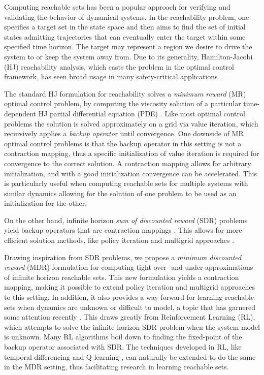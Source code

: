 
Computing reachable sets has been a popular approach for verifying and validating the behavior of dynamical systems. In the reachability problem, one specifies a target set in the state space and then aims to find the set of initial states admitting trajectories that can eventually enter the target within some specified time horizon. The target may represent a region we desire to drive the system to or keep the system away from. Due to its generality, Hamilton-Jacobi (HJ) reachability analysis, which casts the problem in the optimal control framework, has seen broad usage in many safety-critical applications \cite{Akametalu2014, Ding2016, Chen2015a}.

The standard HJ formulation for reachability solves a \emph{minimum reward} (MR) optimal control problem, by computing the viscosity solution of a particular time-dependent HJ partial differential equation (PDE) \cite{Mitchell2005}. Like most optimal control problems the solution is solved approximately on a grid via value iteration, which recursively applies a \emph{backup operator} until convergence. One downside of MR optimal control problems is that the backup operator in this setting is not a contraction mapping, thus a specific initialization of value iteration is required for convergence to the correct solution. A contraction mapping allows for arbitrary initialization, and with a good initialization convergence can be accelerated. This is particularly useful when computing reachable sets for multiple systems with similar dynamics allowing for the solution of one problem to be used as an initialization for the other.

On the other hand, infinite horizon \emph{sum of discounted reward} (SDR) problems yield backup operators that are contraction mappings \cite{Bertsekas1995}. This allows for more efficient solution methods, like policy iteration \cite{Howard1964, Puterman1979} and multigrid approaches \cite{Alla2015, Chow1991}.   
 
Drawing inspiration from SDR problems, we propose a \emph{minimum discounted reward} (MDR) formulation for computing tight over- and under-approximations of infinite horizon reachable sets. This new formulation yields a contraction mapping, making it possible to extend policy iteration and multigrid approaches to this setting. In addition, it also provides a way forward for learning reachable sets when dynamics are unknown or difficult to model, a topic that has garnered some attention recently \cite{Akametalu2015,Djeridane2006}. This draws greatly from Reinforcement Learning (RL), which attempts to solve the infinite horizon SDR problem when the system model is unknown. Many RL algorithms boil down to finding the fixed-point of the backup operator associated with SDR. The techniques developed in RL, like temporal differencing \cite{Sutton1988} and Q-learning \cite{Watkins1992}, can naturally be extended to do the same in the MDR setting, thus facilitating research in learning reachable sets.


